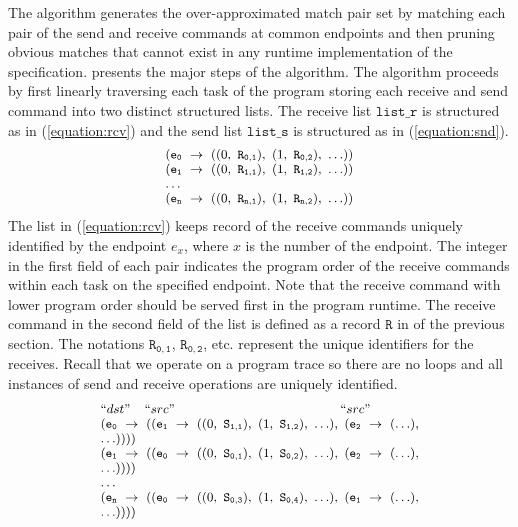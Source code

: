 The algorithm generates the over-approximated match pair set by matching each pair of the send and receive commands at common endpoints and then pruning obvious matches that cannot exist in any runtime implementation of the specification.  presents the major steps of the algorithm. The algorithm proceeds by first linearly traversing each task of the program storing each receive and send command into two distinct structured lists. The receive list $\mathtt{list\_r}$ is structured as in (\ref{equation:rcv}) and the send list $\mathtt{list\_s}$ is structured as in (\ref{equation:snd}).
\begin{equation}
\footnotesize \begin{array}{l}
(\mathtt{e_0}\ \rightarrow\ ((0,\ \mathtt{R_{0,1}}),\ (1,\ \mathtt{R_{0,2}}),\ \ldots))\\
(\mathtt{e_1}\ \rightarrow\ ((0,\ \mathtt{R_{1,1}}),\ (1,\ \mathtt{R_{1,2}}),\ \ldots))\\
\ldots \\
(\mathtt{e_n}\ \rightarrow\ ((0,\ \mathtt{R_{n,1}}),\ (1,\ \mathtt{R_{n,2}}),\ \ldots))\\
\end{array}
\label{equation:rcv}
\end{equation}
The list in (\ref{equation:rcv}) keeps record of the receive commands uniquely identified by the endpoint $\mathit{e}_x$, where $x$ is the number of the endpoint. The integer in the first field of each pair indicates the program order of the receive commands within each task on the specified endpoint. Note that the receive command with lower program order should be served first in the program runtime. The receive command in the second field of the list is defined as a record $\mathtt{R}$ in  of the previous section. The notations $\mathtt{R_{0,1}}$, $\mathtt{R_{0,2}}$, etc. represent the unique identifiers for the receives. Recall that we operate on a program trace so there are no loops and all instances of send and receive operations are uniquely identified.
\begin{equation}
\footnotesize \begin{array}{l}
 ``dst" \;\;\;\; ``src" \;\;\;\;\;\;\;\;\;\;\;\;\;\;\;\;\;\;\;\;\;\;\;\;\;\;\;\;\;\;\;\;\;\;\;\;\;\;\;\;\;\;\;\;\;\; ``src"\\
(\mathtt{e_0}\ \rightarrow\ ((\mathtt{e_1}\ \rightarrow\ ((0,\ \mathtt{S_{1,1}}),\ (1,\ \mathtt{S_{1,2}}),\ \ldots),\ (\mathtt{e_2}\ \rightarrow\ (\ldots),\\ \ldots))))\\
(\mathtt{e_1}\ \rightarrow\ ((\mathtt{e_0}\ \rightarrow\ ((0,\ \mathtt{S_{0,1}}),\ (1,\ \mathtt{S_{0,2}}),\ \ldots),\ (\mathtt{e_2}\ \rightarrow\ (\ldots),\\ \ldots))))\\
 \dots\\
(\mathtt{e_n}\ \rightarrow\ ((\mathtt{e_0}\ \rightarrow\ ((0,\ \mathtt{S_{0,3}}),\ (1,\ \mathtt{S_{0,4}}),\ \ldots),\ (\mathtt{e_1}\ \rightarrow\ (\ldots),\\ \ldots))))\\
\end{array}
\label{equation:snd}
\end{equation}
